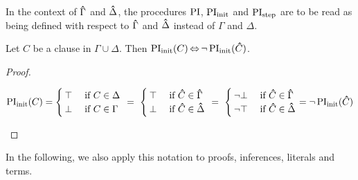 In the context of $\bm\hat{\Gamma}$ and $\bm\hat{\Delta}$, the procedures $\operatorname{PI}$, $\operatorname{PI}_{\mathrm{init}}$ and $\operatorname{PI}_{\mathrm{step}}$ are to be read as being defined with respect to $\bm\hat{\Gamma}$ and $\bm\hat{\Delta}$ instead of $\Gamma$ and $\Delta$.



\begin{lemma}
	\label{lemma:symmetry_base}
	Let $C$ be a clause in $\Gamma \cup \Delta$.
	Then $\operatorname{PI}_{\mathrm{init}}(C) \operatorname{\Leftrightarrow} \lnot \operatorname{PI}_{\mathrm{init}}(\bm\hat{C})$. 
\end{lemma}
\begin{proof}
	\begin{adjustwidth}{-1em}{}
		\[
		\operatorname{PI}_{\mathrm{init}}(C) =
	\begin{cases} \top & \text{ if $C \in \Delta$} \\ \bot & \text{ if $C \in \Gamma$}\end{cases}
	\;\,{=}\;\, \begin{cases} \top & \text{ if $\bm\hat{C} \in \bm\hat{\Gamma}$} \\ \bot & \text{ if $\bm\hat{C} \in \bm\hat{\Delta}$}\end{cases}\\
		\;\,{=}\;\,
	\begin{cases} \lnot \bot & \text{ if $\bm\hat{C} \in \bm\hat{\Gamma}$} \\ \lnot \top & \text{ if $\bm\hat{C} \in \bm\hat{\Delta}$}\end{cases}
		=
		\lnot \operatorname{PI}_{\mathrm{init}}(\bm\hat{C}) 
		\qedhere
	\]
	\end{adjustwidth}
\end{proof}

In the following, we also apply this notation to proofs, inferences, literals and terms.

